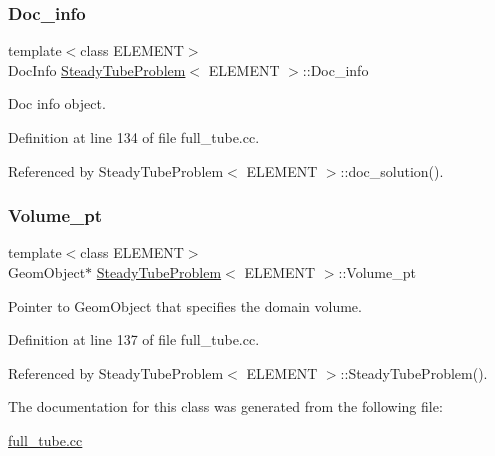 \subsubsection{\texorpdfstring{Doc\+\_\+info}{Doc\_info}}
{\footnotesize\ttfamily template$<$class E\+L\+E\+M\+E\+NT$>$ \\
Doc\+Info \hyperlink{classSteadyTubeProblem}{Steady\+Tube\+Problem}$<$ E\+L\+E\+M\+E\+NT $>$\+::Doc\+\_\+info\hspace{0.3cm}{\ttfamily [private]}}



Doc info object. 



Definition at line 134 of file full\+\_\+tube.\+cc.



Referenced by Steady\+Tube\+Problem$<$ E\+L\+E\+M\+E\+N\+T $>$\+::doc\+\_\+solution().

\mbox{\label{classSteadyTubeProblem_aedad3a2d2afd1f1c306dae289b3c2baf}} 
\subsubsection{\texorpdfstring{Volume\+\_\+pt}{Volume\_pt}}
{\footnotesize\ttfamily template$<$class E\+L\+E\+M\+E\+NT$>$ \\
Geom\+Object$\ast$ \hyperlink{classSteadyTubeProblem}{Steady\+Tube\+Problem}$<$ E\+L\+E\+M\+E\+NT $>$\+::Volume\+\_\+pt\hspace{0.3cm}{\ttfamily [private]}}



Pointer to Geom\+Object that specifies the domain volume. 



Definition at line 137 of file full\+\_\+tube.\+cc.



Referenced by Steady\+Tube\+Problem$<$ E\+L\+E\+M\+E\+N\+T $>$\+::\+Steady\+Tube\+Problem().



The documentation for this class was generated from the following file\+:\begin{DoxyCompactItemize}
\item 
\hyperlink{full__tube_8cc}{full\+\_\+tube.\+cc}\end{DoxyCompactItemize}
